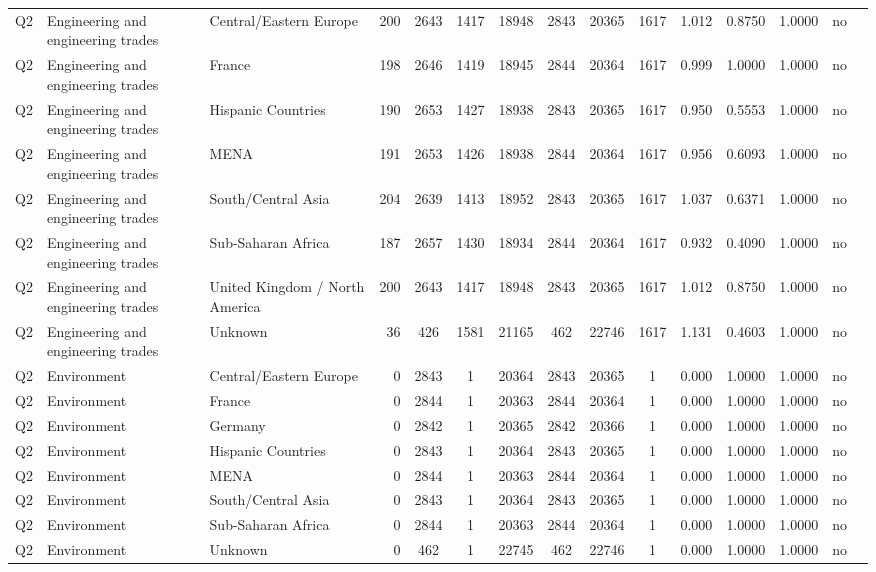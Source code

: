 \begin{longtable}{lllrcccccccccll}
Q2 & Engineering and engineering trades & Central/Eastern Europe & 200 & 2643 & 1417 & 18948 & 2843 & 20365 & 1617 & 1.012 & 0.8750 & 1.0000 & no \\
Q2 & Engineering and engineering trades & France & 198 & 2646 & 1419 & 18945 & 2844 & 20364 & 1617 & 0.999 & 1.0000 & 1.0000 & no \\
Q2 & Engineering and engineering trades & Hispanic Countries & 190 & 2653 & 1427 & 18938 & 2843 & 20365 & 1617 & 0.950 & 0.5553 & 1.0000 & no \\
Q2 & Engineering and engineering trades & MENA & 191 & 2653 & 1426 & 18938 & 2844 & 20364 & 1617 & 0.956 & 0.6093 & 1.0000 & no \\
Q2 & Engineering and engineering trades & South/Central Asia & 204 & 2639 & 1413 & 18952 & 2843 & 20365 & 1617 & 1.037 & 0.6371 & 1.0000 & no \\
Q2 & Engineering and engineering trades & Sub-Saharan Africa & 187 & 2657 & 1430 & 18934 & 2844 & 20364 & 1617 & 0.932 & 0.4090 & 1.0000 & no \\
Q2 & Engineering and engineering trades & United Kingdom / North America & 200 & 2643 & 1417 & 18948 & 2843 & 20365 & 1617 & 1.012 & 0.8750 & 1.0000 & no \\
Q2 & Engineering and engineering trades & Unknown & 36 & 426 & 1581 & 21165 & 462 & 22746 & 1617 & 1.131 & 0.4603 & 1.0000 & no \\
Q2 & Environment & Central/Eastern Europe & 0 & 2843 & 1 & 20364 & 2843 & 20365 & 1 & 0.000 & 1.0000 & 1.0000 & no \\
Q2 & Environment & France & 0 & 2844 & 1 & 20363 & 2844 & 20364 & 1 & 0.000 & 1.0000 & 1.0000 & no \\
Q2 & Environment & Germany & 0 & 2842 & 1 & 20365 & 2842 & 20366 & 1 & 0.000 & 1.0000 & 1.0000 & no \\
Q2 & Environment & Hispanic Countries & 0 & 2843 & 1 & 20364 & 2843 & 20365 & 1 & 0.000 & 1.0000 & 1.0000 & no \\
Q2 & Environment & MENA & 0 & 2844 & 1 & 20363 & 2844 & 20364 & 1 & 0.000 & 1.0000 & 1.0000 & no \\
Q2 & Environment & South/Central Asia & 0 & 2843 & 1 & 20364 & 2843 & 20365 & 1 & 0.000 & 1.0000 & 1.0000 & no \\
Q2 & Environment & Sub-Saharan Africa & 0 & 2844 & 1 & 20363 & 2844 & 20364 & 1 & 0.000 & 1.0000 & 1.0000 & no \\
Q2 & Environment & Unknown & 0 & 462 & 1 & 22745 & 462 & 22746 & 1 & 0.000 & 1.0000 & 1.0000 & no \\

\end{longtable}
